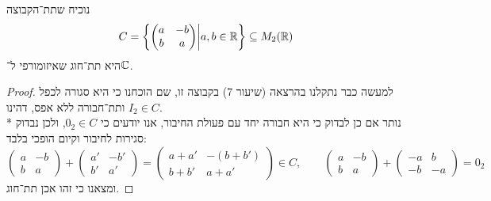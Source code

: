 \Subquestion{}
נוכיח שתת־הקבוצה
\[
	C = \left\{
		\begin{pmatrix}
			a & -b \\
			b & a
		\end{pmatrix}
		\middle|
		a, b \in \mathbb{R}
	\right\}
	\subseteq M_2(\mathbb{R})
\]
היא תת־חוג שאיזומורפי ל־$\mathbb{C}$.
\begin{proof}
	למעשה כבר נתקלנו בהרצאה (שיעור 7) בקבוצה זו, שם הוכחנו כי היא סגורה לכפל ותת־חבורה ללא אפס, דהינו $I_2 \in C$. \\*
	נותר אם כן לבדוק כי היא חבורה יחד עם פעולת החיבור, אנו יודעים כי $0_2 \in C$, ולכן נבדוק סגירות לחיבור וקיום הופכי בלבד:
	\[
		\begin{pmatrix}
			a & -b \\
			b & a
		\end{pmatrix}
		+
		\begin{pmatrix}
			a' & -b' \\
			b' & a'
		\end{pmatrix}
		= \begin{pmatrix}
			a + a' & -(b + b') \\
			b + b' & a + a'
		\end{pmatrix}
		\in C,
		\qquad
		\begin{pmatrix}
			a & -b \\
			b & a
		\end{pmatrix}
		+
		\begin{pmatrix}
			-a & b \\
			-b & -a
		\end{pmatrix}
		= 0_2
	\]
	ומצאנו כי זהו אכן תת־חוג.


\end{proof}
